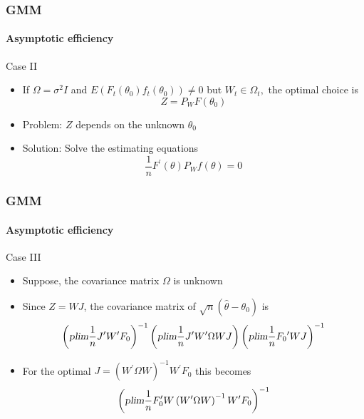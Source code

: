\documentclass{beamer}
\begin{document}
\begin{frame}\frametitle{GMM}\framesubtitle{Asymptotic efficiency}
Case II
\begin{itemize}
    \item If $\Omega =\sigma ^{2}I$ and $E(F_{t}(\theta _{0})f_{t}(\theta_{0}))\neq 0$ but $W_{t}\in \Omega _{t},$\newline
    the optimal choice is
    \begin{equation*}
    Z=P_{W}F(\theta _{0})
    \end{equation*}
    \item Problem: $Z$ depends on the unknown $\theta _{0}$
    \item Solution: Solve the estimating equations%
    \begin{equation*}
    \frac{1}{n}F^{\prime }(\theta )P_{W}f(\theta )=0
    \end{equation*}
\end{itemize}
\end{frame}


\begin{frame}\frametitle{GMM}\framesubtitle{Asymptotic efficiency}
Case III
\begin{itemize}
    \item Suppose, the covariance matrix $\Omega $ is unknown
    \item Since $Z=WJ$, the covariance matrix of $\sqrt{n}(\hat{\theta}-\theta_{0})$ is
    \begin{equation*}
    \left( \textsl{plim}\frac{1}{n}J^{\prime }W^{\prime }F_{0}\right)^{-1}\left( \textsl{plim}\frac{1}{n}J^{\prime }W^{\prime }\Omega WJ\right)
    \left( \textsl{plim}\frac{1}{n}F_{0}{}^{\prime }WJ\right) ^{-1}
    \end{equation*}
    \item For the optimal $J=\left( W^{\prime }\Omega W\right) ^{-1}W^{\prime}F_{0}$ this becomes
    \begin{equation*}
    \left( \textsl{plim}\frac{1}{n}F_{0}^{\prime }W\left( W^{\prime }\Omega W\right) ^{-1}W^{\prime }F_{0}\right) ^{-1}
    \end{equation*}
\end{itemize}
\end{frame}
\end{document}
